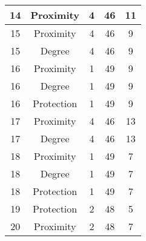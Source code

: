 \documentclass[results.tex]{subfiles}
\begin{document}
\begin{center}
\begin{tabular}{| c || c | c | c | c |}
            \hline
            14                      & Proximity                    & 4                      & 46                      & 11                   \\
            \hline
            15                      & Proximity                    & 4                      & 46                      & 9                    \\
            \hline
            15                      & Degree                       & 4                      & 46                      & 9                    \\
            \hline
            16                      & Proximity                    & 1                      & 49                      & 9                    \\
            \hline
            16                      & Degree                       & 1                      & 49                      & 9                    \\
            \hline
            16                      & Protection                   & 1                      & 49                      & 9                    \\
            \hline
            17                      & Proximity                    & 4                      & 46                      & 13                   \\
            \hline
            17                      & Degree                       & 4                      & 46                      & 13                   \\
            \hline
            18                      & Proximity                    & 1                      & 49                      & 7                    \\
            \hline
            18                      & Degree                       & 1                      & 49                      & 7                    \\
            \hline
            18                      & Protection                   & 1                      & 49                      & 7                    \\
            \hline
            19                      & Protection                   & 2                      & 48                      & 5                    \\
            \hline
            20                      & Proximity                    & 2                      & 48                      & 7                    \\

\end{tabular}
\end{center}
\end{document}

